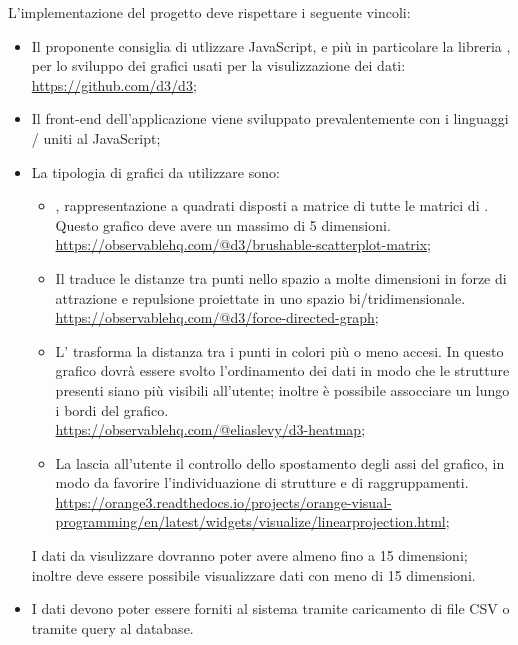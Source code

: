 \documentclass[../analisi-dei-requisiti.tex]{subfiles}
\begin{document}
L'implementazione del progetto deve rispettare i seguente vincoli:
\begin{itemize}
    \item Il proponente consiglia di utlizzare JavaScript, e più in particolare la libreria , per lo sviluppo dei grafici usati per la visulizzazione dei dati: \\ \url{https://github.com/d3/d3};
    \item Il front-end dell'applicazione viene sviluppato prevalentemente con i linguaggi / uniti al JavaScript;
    \item La tipologia di grafici da utilizzare sono:
    \begin{itemize}
        \item {}, rappresentazione a quadrati disposti a matrice di tutte le matrici di . Questo grafico deve avere un massimo di 5 dimensioni. \\ \url{https://observablehq.com/@d3/brushable-scatterplot-matrix};
        \item Il  traduce le distanze tra punti nello spazio a molte dimensioni in forze di attrazione e repulsione proiettate in uno spazio bi/tridimensionale. \\  \url{https://observablehq.com/@d3/force-directed-graph};
        \item L' trasforma la distanza tra i punti in colori più o meno accesi. In questo grafico dovrà essere svolto l'ordinamento dei dati in modo che le strutture presenti siano più visibili all'utente; inoltre è possibile assocciare un  lungo i bordi del grafico. \\ \url{https://observablehq.com/@eliaslevy/d3-heatmap}; 
        \item La  lascia all'utente il controllo dello spostamento degli assi del grafico, in modo da favorire l'individuazione di strutture e di raggruppamenti. \\ \url{https://orange3.readthedocs.io/projects/orange-visual-programming/en/latest/widgets/visualize/linearprojection.html};
    \end{itemize}
    I dati da visulizzare dovranno poter avere almeno fino a 15 dimensioni; inoltre deve essere possibile visualizzare dati con meno di 15 dimensioni. 
    \item I dati devono poter essere forniti al sistema tramite caricamento di file CSV o tramite query al database.
\end{itemize}
\end{document}
